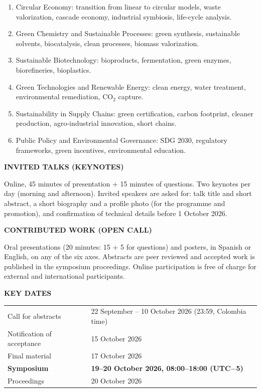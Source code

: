 \documentclass[11pt,a4paper]{article}
\begin{document}
\begin{enumerate}\setlength{\itemsep}{0.1cm}
\item Circular Economy: transition from linear to circular models, waste valorization, cascade economy, industrial symbiosis, life-cycle analysis.
\item Green Chemistry and Sustainable Processes: green synthesis, sustainable solvents, biocatalysis, clean processes, biomass valorization.
\item Sustainable Biotechnology: bioproducts, fermentation, green enzymes, biorefineries, bioplastics.
\item Green Technologies and Renewable Energy: clean energy, water treatment, environmental remediation, CO$_2$ capture.
\item Sustainability in Supply Chains: green certification, carbon footprint, cleaner production, agro-industrial innovation, short chains.
\item Public Policy and Environmental Governance: SDG 2030, regulatory frameworks, green incentives, environmental education.
\end{enumerate}

\vspace{0.2cm}

\noindent
\textbf{INVITED TALKS (KEYNOTES)}

Online, 45 minutes of presentation + 15 minutes of questions. Two keynotes per day (morning and afternoon).
Invited speakers are asked for: talk title and short abstract, a short biography and a profile photo
(for the programme and promotion), and confirmation of technical details before 1 October 2026.

\vspace{0.2cm}

\noindent
\textbf{CONTRIBUTED WORK (OPEN CALL)}

Oral presentations (20 minutes: 15 + 5 for questions) and posters, in Spanish or English, on any of the six axes.
Abstracts are peer reviewed and accepted work is published in the symposium proceedings.
Online participation is free of charge for external and international participants.

\vspace{0.2cm}

\noindent
\textbf{KEY DATES}

\begin{tabular}{ll}
Call for abstracts & 22 September -- 10 October 2026 (23:59, Colombia time) \\
Notification of acceptance & 15 October 2026 \\
Final material & 17 October 2026 \\
\textbf{Symposium} & \textbf{19--20 October 2026, 08:00--18:00 (UTC$-$5)} \\
Proceedings & 20 October 2026 \\
\end{tabular}
\end{document}
